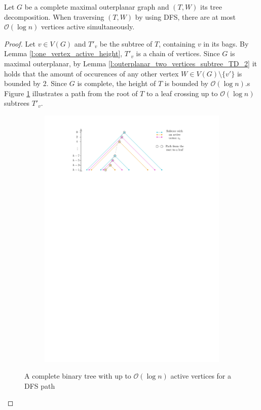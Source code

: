 \begin{lemma}\label{l:complete_maximal_outerplanar_log_n_active}
	Let $G$ be a complete maximal outerplanar graph and $(T,W)$ its tree decomposition. When traversing $(T,W)$ by using DFS, there are at most $\mathcal{O}(\log n)$ vertices active simultaneously.
\end{lemma}
\begin{proof}
	Let $v \in V(G)$ and $T'_{v}$ be the subtree of $T$, containing $v$ in its bags. By Lemma \ref{l:one_vertex_active_height}, $T'_{v}$ is a chain of vertices. Since $G$ is maximal outerplanar, by Lemma \ref{l:outerplanar_two_vertices_subtree_TD_2} it holds that the amount of occurences of any other vertex $W\in V(G)\setminus\{v'\}$ is bounded by 2. Since $G$ is complete, the height of $T$ is bounded by $\mathcal{O}(\log n)$.s Figure \ref{im:active_vertices_log_n} illustrates a path from the root of $T$ to a leaf crossing up to $\mathcal{O}(\log n)$ subtrees $T'_{v}$.
		\begin{figure}[H]
		\centering
		\begin{subfigure}{\textwidth}
			\centering
			\includegraphics[page=1,width=0.9\linewidth]{graphics/active_vertices_log_n.pdf}
		\end{subfigure}
		\caption{A complete binary tree with up to $\mathcal{O}(\log n)$ active vertices for a DFS path}\label{im:active_vertices_log_n}
	\end{figure}


\end{proof}
